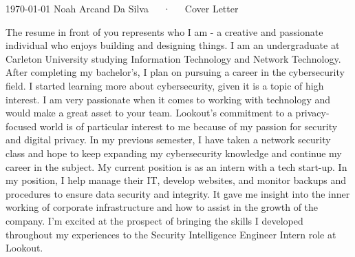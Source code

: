 \documentclass[11pt, a4paper]{awesome-cv}
\begin{document}
\makecvheader[R]

\makecvfooter
  {\today}
  {Noah Arcand Da Silva~~~·~~~Cover Letter}
  {}

\makelettertitle


\begin{cvletter}

The resume in front of you represents who I am - a creative and passionate individual who enjoys building and designing things.  I am an undergraduate at Carleton University studying Information Technology and Network Technology. After completing my bachelor's, I plan on pursuing a career in the cybersecurity field. I started learning more about cybersecurity, given it is a topic of high interest. I am very passionate when it comes to working with technology and would make a great asset to your team.
Lookout's commitment to a privacy-focused world is of particular interest to me because of my passion for security and digital privacy. In my previous semester, I have taken a network security class and hope to keep expanding my cybersecurity knowledge and continue my career in the subject.
My current position is as an intern with a tech start-up. In my position, I help manage their IT, develop websites, and monitor backups and procedures to ensure data security and integrity. It gave me insight into the inner working of corporate infrastructure and how to assist in the growth of the company. I’m excited at the prospect of bringing the skills I developed throughout my experiences to the Security Intelligence Engineer Intern role at Lookout.

\end{cvletter}


\makeletterclosing
\end{document}
